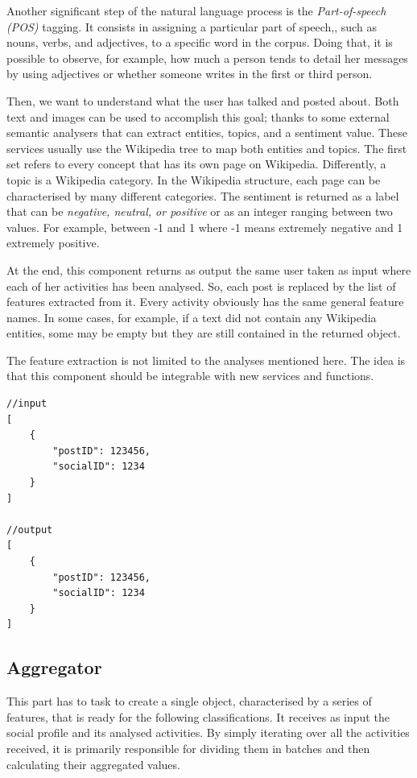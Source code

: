 Another significant step of the natural language process is the \emph{Part-of-speech (POS)} tagging. It consists in assigning a particular part of speech,, such as nouns, verbs, and adjectives, to a specific word in the corpus.
Doing that, it is possible to observe, for example, how much a person tends to detail her messages by using adjectives or whether someone writes in the first or third person.

Then, we want to understand what the user has talked and posted about. Both text and images can be used to accomplish this goal; thanks to some external semantic analysers that can extract entities, topics, and a sentiment value.
These services usually use the Wikipedia tree to map both entities and topics. The first set refers to every concept that has its own page on Wikipedia. Differently, a topic is a Wikipedia category.
In the Wikipedia structure, each page can be characterised by many different categories. 
The sentiment is returned as a label that can be \textit{negative, neutral, or positive} or as an integer ranging between two values. For example, between -1 and 1 where -1 means extremely negative and 1 extremely positive.

At the end, this component returns as output the same user taken as input where each of her activities has been analysed. So, each post is replaced by the list of features extracted from it.
Every activity obviously has the same general feature names. In some cases, for example, if a text did not contain any Wikipedia entities, some may be empty but they are still contained in the returned object.

The feature extraction is not limited to the analyses mentioned here. The idea is that this component should be integrable with new services and functions.

\begin{multicols}{2}
\begin{verbatim}
//input
[
    {
        "postID": 123456,
        "socialID": 1234
    }
]
    
//output
[
    {
        "postID": 123456,
        "socialID": 1234
    }
]
\end{verbatim}
\end{multicols}

\subsection{Aggregator}
This part has to task to create a single object, characterised by a series of features, that is ready for the following classifications. It receives as input the social profile and its analysed activities.
By simply iterating over all the activities received, it is primarily responsible for dividing them in batches and then calculating their aggregated values.

